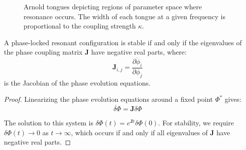 \begin{figure}[ht]
\centering
{}
\caption{Arnold tongues depicting regions of parameter space where resonance occurs. The width of each tongue at a given frequency is proportional to the coupling strength $\kappa$.}
\label{fig:arnold_tongues}
\end{figure}

\begin{lemma}
A phase-locked resonant configuration is stable if and only if the eigenvalues of the phase coupling matrix $\mathbf{J}$ have negative real parts, where:
\begin{equation}
\mathbf{J}_{i,j} = \frac{\partial \dot{\phi}_i}{\partial \phi_j}
\end{equation}
is the Jacobian of the phase evolution equations.
\end{lemma}

\begin{proof}
Linearizing the phase evolution equations around a fixed point $\Phi^*$ gives:
\begin{equation}
\dot{\delta\Phi} = \mathbf{J} \delta\Phi
\end{equation}

The solution to this system is $\delta\Phi(t) = e^{\mathbf{J}t} \delta\Phi(0)$. For stability, we require $\delta\Phi(t) \to 0$ as $t \to \infty$, which occurs if and only if all eigenvalues of $\mathbf{J}$ have negative real parts.
\end{proof}

